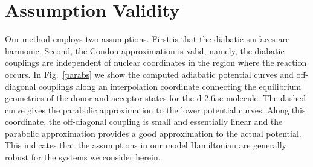 
\section{Assumption Validity}

Our method employs two assumptions. First is that the diabatic surfaces are harmonic. Second, the Condon approximation is valid, namely, the diabatic couplings are independent of nuclear coordinates in the region where the reaction occurs.
In Fig.~\ref{parabs} we show the computed adiabatic potential curves and off-diagonal couplings along an interpolation coordinate
connecting the equilibrium geometries of the donor and acceptor states for the d-2,6ae molecule.
The dashed curve gives the parabolic approximation to the
lower potential curves.  Along this coordinate, the off-diagonal coupling is small and essentially linear and the parabolic
approximation provides a good approximation to the actual potential.  This indicates that the assumptions in our model Hamiltonian
are generally robust for the systems we consider herein.

